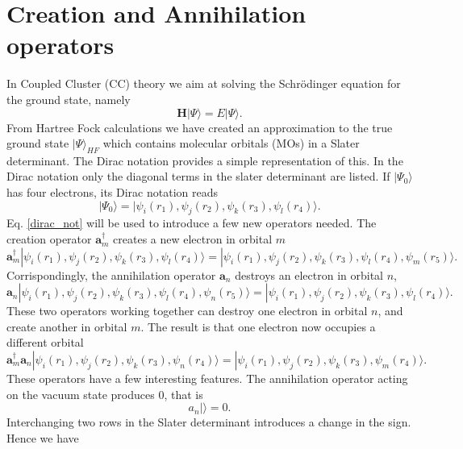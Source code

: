 \documentclass[a4paper,norsk,11pt,twoside]{report}
\begin{document}
\section{Creation and Annihilation operators}
In Coupled Cluster (CC) theory we aim at solving the Schr\"{o}dinger equation for the ground state, namely
\begin{equation}
\textbf{H} | \Psi \rangle = E | \Psi \rangle \label{SE} .
\end{equation}
From Hartree Fock calculations we have created an approximation to the
true ground state $|\Psi\rangle_{HF}$ which contains molecular orbitals (MOs) in a Slater
determinant. The Dirac notation provides a simple representation of
this. In the Dirac notation only the diagonal terms in the slater
determinant are listed. If $|\Psi_0 \rangle$ has four electrons, its  Dirac
notation reads
\begin{equation}
|\Psi_0 \rangle =  |\psi_i(r_1), \psi_j(r_2), \psi_k(r_3), \psi_l(r_4) \rangle . \label{dirac_not} 
\end{equation}
Eq. \eqref{dirac_not} will be used to introduce a few new operators needed. The creation operator $\textbf{a}^{\dag}_m$ creates a new electron in orbital $m$
\begin{equation}
\textbf{a}^{\dag}_m |\psi_i(r_1), \psi_j(r_2), \psi_k(r_3), \psi_l(r_4) \rangle = |\psi_i(r_1), \psi_j(r_2), \psi_k(r_3), \psi_l(r_4), \psi_m(r_5) \rangle .
\end{equation}
Corrispondingly, the annihilation operator $\textbf{a}_n$ destroys an electron in orbital $n$, 
\begin{equation}
\textbf{a}_n |\psi_i(r_1), \psi_j(r_2), \psi_k(r_3), \psi_l(r_4), \psi_n(r_5) \rangle = |\psi_i(r_1), \psi_j(r_2), \psi_k(r_3), \psi_l(r_4) \rangle  .
\end{equation}
These two operators working together can destroy one electron in
orbital $n$, and create another in orbital $m$. The result is that one
electron now occupies a different orbital
\begin{equation}
\textbf{a}^{\dag}_m \textbf{a}_n |\psi_i(r_1), \psi_j(r_2), \psi_k(r_3), \psi_n(r_4) \rangle = |\psi_i(r_1), \psi_j(r_2), \psi_k(r_3), \psi_m(r_4) \rangle .
\end{equation}
These operators have a few interesting features. The annihilation operator acting on the vacuum state produces 0, that is
\begin{equation}
a_n | \rangle = 0  .
\end{equation}
Interchanging two rows in the Slater determinant introduces a change in the sign. Hence we have
\end{document}
